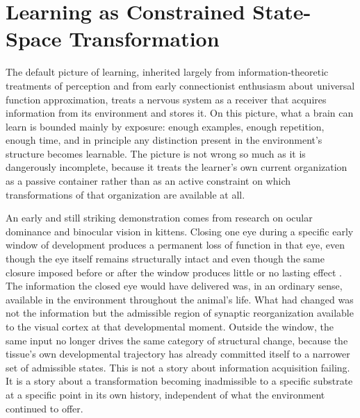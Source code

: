 \documentclass[11pt]{book}
\begin{document}
\section{Learning as Constrained State-Space Transformation}

The default picture of learning, inherited largely from information-theoretic treatments of perception and from early connectionist enthusiasm about universal function approximation, treats a nervous system as a receiver that acquires information from its environment and stores it. On this picture, what a brain can learn is bounded mainly by exposure: enough examples, enough repetition, enough time, and in principle any distinction present in the environment's structure becomes learnable. The picture is not wrong so much as it is dangerously incomplete, because it treats the learner's own current organization as a passive container rather than as an active constraint on which transformations of that organization are available at all.

An early and still striking demonstration comes from research on ocular dominance and binocular vision in kittens. Closing one eye during a specific early window of development produces a permanent loss of function in that eye, even though the eye itself remains structurally intact and even though the same closure imposed before or after the window produces little or no lasting effect \cite{hubelwiesel1970}. The information the closed eye would have delivered was, in an ordinary sense, available in the environment throughout the animal's life. What had changed was not the information but the admissible region of synaptic reorganization available to the visual cortex at that developmental moment. Outside the window, the same input no longer drives the same category of structural change, because the tissue's own developmental trajectory has already committed itself to a narrower set of admissible states. This is not a story about information acquisition failing. It is a story about a transformation becoming inadmissible to a specific substrate at a specific point in its own history, independent of what the environment continued to offer.
\end{document}
